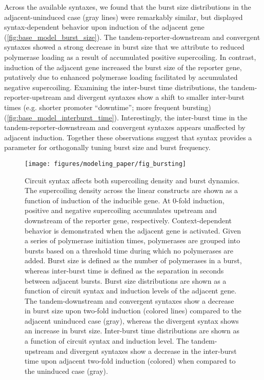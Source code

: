\documentclass[11pt]{article}
\begin{document}
Across the available syntaxes, we found that the burst size distributions in the adjacent-uninduced case (gray lines) were remarkably similar, but displayed syntax-dependent behavior upon induction of the adjacent gene (\cref{fig:base_model_burst_size}). The tandem-reporter-downstream and convergent syntaxes showed a strong decrease in burst size that we attribute to reduced polymerase loading as a result of accumulated positive supercoiling. In contrast, induction of the adjacent gene increased the burst size of the reporter gene, putatively due to enhanced polymerase loading facilitated by accumulated negative supercoiling. Examining the inter-burst time distributions, the tandem-reporter-upstream and divergent syntaxes show a shift to smaller inter-burst times (e.g. shorter promoter ``downtime''; more frequent bursting) (\cref{fig:base_model_interburst_time}). Interestingly, the inter-burst time in the tandem-reporter-downstream and convergent syntaxes appears unaffected by adjacent induction. Together these observations suggest that syntax provides a parameter for orthogonally tuning burst size and burst frequency.

\begin{figure}[htbp]
    \centering
    {\texttt{[image: figures/modeling\_paper/fig\_bursting]}
    \label{fig:base_model_sc_density} %
    \label{fig:burst_dynamics_cartoon}
    \label{fig:base_model_burst_size} %
    \label{fig:base_model_interburst_time} %
    }
    \caption{Circuit syntax affects both supercoiling density and burst dynamics.
         The supercoiling density across the linear constructs are shown as a function of induction of the inducible gene. At 0-fold induction, positive and negative supercoiling accumulates upstream and downstream of the reporter gene, respectively. Context-dependent behavior is demonstrated when the adjacent gene is activated.
         Given a series of polymerase initiation times, polymerases are grouped into bursts based on a threshold time during which no polymerases are added. Burst size is defined as the number of polymerases in a burst, whereas inter-burst time is defined as the separation in seconds between adjacent bursts. 
         Burst size distributions are shown as a function of circuit syntax and induction levels of the adjacent gene. The tandem-downstream and convergent syntaxes show a decrease in burst size upon two-fold induction (colored lines) compared to the adjacent uninduced case (gray), whereas the divergent syntax shows an increase in burst size.
         Inter-burst time distributions are shown as a function of circuit syntax and induction level. The tandem-upstream and divergent syntaxes show a decrease in the inter-burst time upon adjacent two-fold induction (colored) when compared to the uninduced case (gray).
    }
    \label{fig:top:bursting}
\end{figure}
\end{document}
